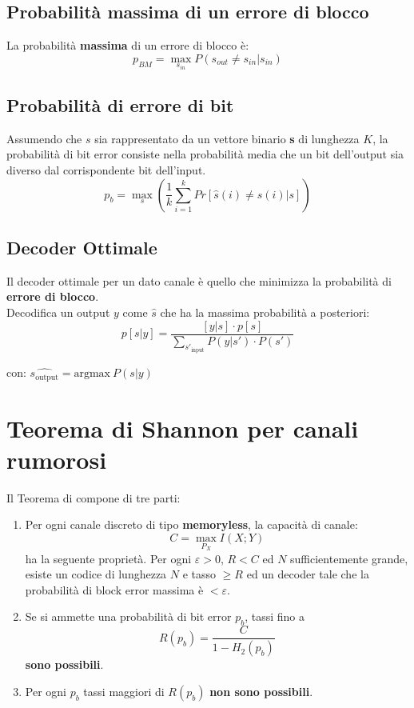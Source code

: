 \subsection{Probabilità massima di un errore di blocco}
La probabilità \textbf{massima} di un errore di blocco è:
\begin{equation}
	p_{BM} = \max_{s_{in}} P(s_{out} \neq s_{in}|s_{in})
\end{equation}

\subsection{Probabilità di errore di bit}
Assumendo che $s$ sia rappresentato da un vettore binario \textbf{s} di lunghezza $K$, la probabilità di bit error consiste nella probabilità media che un bit dell’output sia
diverso dal corrispondente bit dell’input.
\begin{equation}
	p_b = \max_{s} \left(\frac{1}{k} \sum_{i=1}^{k} Pr[\hat{s}(i) \neq s(i)|s]\right)
\end{equation}

\subsection{Decoder Ottimale}
Il decoder ottimale per un dato canale è quello che minimizza la probabilità di \textbf{errore di blocco}.\\ 
Decodifica un output $y$ come $\hat{s}$ che ha la massima probabilità a posteriori:
\begin{equation}
	p[s|y] = \frac{[y|s]\cdot p[s]}{\sum_{s'_{\text{input}}} P(y|s')\cdot P(s')}
\end{equation}

con: $\hat{s_{\text{output}}} = \text{argmax}\ P(s|y)$
\newpage
\section{Teorema di Shannon per canali rumorosi}
Il Teorema di compone di tre parti:
\begin{enumerate}
	\item Per ogni canale discreto di tipo \textbf{memoryless}, la capacità di canale:
	\begin{equation}
		C = \max_{P_X} I(X;Y)
	\end{equation}
	ha la seguente proprietà. Per ogni $\varepsilon > 0$, $R < C$ ed $N$ sufficientemente grande, esiste un codice di lunghezza $N$ e tasso $\geq R$ ed un decoder tale che la probabilità di block error massima è $< \varepsilon$.
	
	\item Se si ammette una probabilità di bit error $p_b$, tassi fino a
	\begin{equation}
		R(p_b) = \frac{C}{1 - H_2(p_b)}
	\end{equation}
	\textbf{sono possibili}.
	
	\item Per ogni $p_b$ tassi maggiori di $R(p_b)$ \textbf{non sono possibili}.
\end{enumerate}

